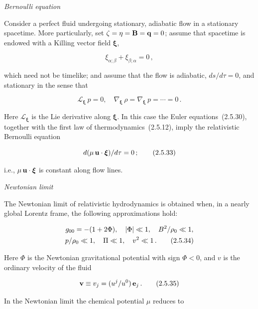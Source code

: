 \textit{Bernoulli equation}

Consider a perfect fluid undergoing stationary, adiabatic flow in a stationary
spacetime.  More particularly, set $\zeta = \eta = \mathbf{B} = \mathbf{q} = 0$; assume that spacetime is
endowed with a Killing vector field $\boldsymbol{\xi}$,

\begin{equation}
\xi_{\alpha;\beta} + \xi_{\beta;\alpha} = 0\,,
\tag{2.5.31}
\end{equation}

which need not be timelike; and assume that the flow is adiabatic, $ds/d\tau = 0$,
and stationary in the sense that

\begin{equation}
\mathscr{L}_{\boldsymbol{\xi}}\,p = 0, \quad
\nabla_{\boldsymbol{\xi}}\,\rho = \nabla_{\boldsymbol{\xi}}\,p = \cdots = 0\,.
\tag{2.5.32}
\end{equation}

Here $\mathscr{L}_{\boldsymbol{\xi}}$ is the Lie derivative along $\boldsymbol{\xi}$.  In this case the Euler equations~(2.5.30),
together with the first law of thermodynamics~(2.5.12), imply the relativistic
Bernoulli equation

\begin{equation}
d(\mu\,\mathbf{u}\cdot\boldsymbol{\xi})/d\tau = 0\,;
\tag{2.5.33}
\end{equation}

i.e., $\mu\,\mathbf{u}\cdot\boldsymbol{\xi}$ is constant along flow lines.

\bigskip
\textit{Newtonian limit}

The Newtonian limit of relativistic hydrodynamics is obtained when, in a nearly
global Lorentz frame, the following approximations hold:

\begin{gather}
g_{00} = -(1 + 2\Phi), \quad |\Phi| \ll 1, \quad
B^2/\rho_0 \ll 1,
\notag\\
p/\rho_0 \ll 1, \quad \Pi \ll 1, \quad v^2 \ll 1\,.
\tag{2.5.34}
\end{gather}

Here $\Phi$ is the Newtonian gravitational potential with sign $\Phi < 0$, and $v$ is the
ordinary velocity of the fluid

\begin{equation}
\mathbf{v} \equiv v_j = (u^j/u^0)\,\mathbf{e}_j\,.
\tag{2.5.35}
\end{equation}

In the Newtonian limit the chemical potential $\mu$ reduces to

